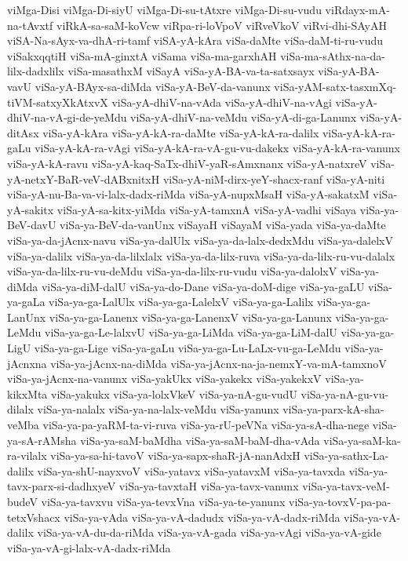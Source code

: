 {viMga-Disi
viMga-Di-siyU
viMga-Di-su-tAtxre
viMga-Di-su-vudu
viRdayx-mA-na-tAvxtf
viRkA-sa-saM-koVcw
viRpa-ri-loVpoV
viRveVkoV
viRvi-dhi-SAyAH
viSA-Na-sAyx-va-dhA-ri-tamf
viSA-yA-kAra
viSa-daMte
viSa-daM-ti-ru-vudu
viSakxqqtiH
viSa-mA-ginxtA
viSama
viSa-ma-garxhAH
viSa-ma-sAthx-na-da-lilx-dadxlilx
viSa-masathxM
viSayA
viSa-yA-BA-va-ta-satxsayx
viSa-yA-BA-vavU
viSa-yA-BAyx-sa-diMda
viSa-yA-BeV-da-vanunx
viSa-yAM-satx-tasxmXq-tiVM-satxyXkAtxvX
viSa-yA-dhiV-na-vAda
viSa-yA-dhiV-na-vAgi
viSa-yA-dhiV-na-vA-gi-de-yeMdu
viSa-yA-dhiV-na-veMdu
viSa-yA-di-ga-Lanunx
viSa-yA-ditAsx
viSa-yA-kAra
viSa-yA-kA-ra-daMte
viSa-yA-kA-ra-dalilx
viSa-yA-kA-ra-gaLu
viSa-yA-kA-ra-vAgi
viSa-yA-kA-ra-vA-gu-vu-dakekx
viSa-yA-kA-ra-vanunx
viSa-yA-kA-ravu
viSa-yA-kaq-SaTx-dhiV-yaR-sAmxnanx
viSa-yA-natxreV
viSa-yA-netxY-BaR-veV-dABxnitxH
viSa-yA-niM-dirx-yeY-shacx-ranf
viSa-yA-niti
viSa-yA-nu-Ba-va-vi-lalx-dadx-riMda
viSa-yA-nupxMsaH
viSa-yA-sakatxM
viSa-yA-sakitx
viSa-yA-sa-kitx-yiMda
viSa-yA-tamxnA
viSa-yA-vadhi
viSaya
viSa-ya-BeV-davU
viSa-ya-BeV-da-vanUnx
viSayaH
viSayaM
viSa-yada
viSa-ya-daMte
viSa-ya-da-jAcnx-navu
viSa-ya-dalUlx
viSa-ya-da-lalx-dedxMdu
viSa-ya-dalelxV
viSa-ya-dalilx
viSa-ya-da-lilxlalx
viSa-ya-da-lilx-ruva
viSa-ya-da-lilx-ru-vu-dalalx
viSa-ya-da-lilx-ru-vu-deMdu
viSa-ya-da-lilx-ru-vudu
viSa-ya-dalolxV
viSa-ya-diMda
viSa-ya-diM-dalU
viSa-ya-do-Dane
viSa-ya-doM-dige
viSa-ya-gaLU
viSa-ya-gaLa
viSa-ya-ga-LalUlx
viSa-ya-ga-LalelxV
viSa-ya-ga-Lalilx
viSa-ya-ga-LanUnx
viSa-ya-ga-Lanenx
viSa-ya-ga-LanenxV
viSa-ya-ga-Lanunx
viSa-ya-ga-LeMdu
viSa-ya-ga-Le-lalxvU
viSa-ya-ga-LiMda
viSa-ya-ga-LiM-dalU
viSa-ya-ga-LigU
viSa-ya-ga-Lige
viSa-ya-gaLu
viSa-ya-ga-Lu-LaLx-vu-ga-LeMdu
viSa-ya-jAcnxna
viSa-ya-jAcnx-na-diMda
viSa-ya-jAcnx-na-ja-nemxY-va-mA-tamxnoV
viSa-ya-jAcnx-na-vanunx
viSa-yakUkx
viSa-yakekx
viSa-yakekxV
viSa-ya-kikxMta
viSa-yakukx
viSa-ya-lolxVkeV
viSa-ya-nA-gu-vudU
viSa-ya-nA-gu-vu-dilalx
viSa-ya-nalalx
viSa-ya-na-lalx-veMdu
viSa-yanunx
viSa-ya-parx-kA-sha-veMba
viSa-ya-pa-yaRM-ta-vi-ruva
viSa-ya-rU-peVNa
viSa-ya-sA-dha-nege
viSa-ya-sA-rAMsha
viSa-ya-saM-baMdha
viSa-ya-saM-baM-dha-vAda
viSa-ya-saM-ka-ra-vilalx
viSa-ya-sa-hi-tavoV
viSa-ya-sapx-shaR-jA-nanAdxH
viSa-ya-sathx-La-dalilx
viSa-ya-shU-nayxvoV
viSa-yatavx
viSa-yatavxM
viSa-ya-tavxda
viSa-ya-tavx-parx-si-dadhxyeV
viSa-ya-tavxtaH
viSa-ya-tavx-vanunx
viSa-ya-tavx-veM-budeV
viSa-ya-tavxvu
viSa-ya-tevxVna
viSa-ya-te-yanunx
viSa-ya-tovxV-pa-pa-tetxVshacx
viSa-ya-vAda
viSa-ya-vA-dadudx
viSa-ya-vA-dadx-riMda
viSa-ya-vA-dalilx
viSa-ya-vA-du-da-riMda
viSa-ya-vA-gada
viSa-ya-vAgi
viSa-ya-vA-gide
viSa-ya-vA-gi-lalx-vA-dadx-riMda
}
